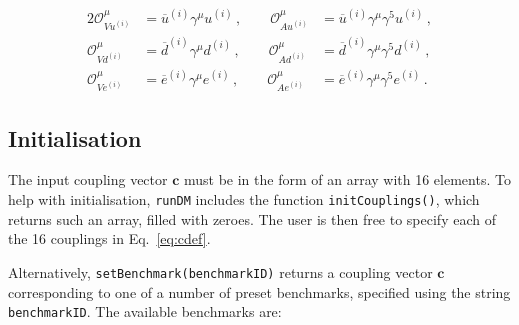\documentclass[notitlepage,12pt]{article}
\newcommand{\runDM}{\texttt{runDM}\xspace}
\begin{document}
\begin{alignat}{2}
\mathcal{O}_{Vu^{(i)}}^\mu &= \overline{u}^{(i)} \gamma^\mu u^{(i)}\,, \qquad \mathcal{O}_{Au^{(i)}}^\mu &= \overline{u}^{(i)} \gamma^\mu \gamma^5 u^{(i)}\,, \nonumber \\
\mathcal{O}_{Vd^{(i)}}^\mu &= \overline{d}^{(i)} \gamma^\mu d^{(i)}\,, \qquad \mathcal{O}_{Ad^{(i)}}^\mu &=  \overline{d}^{(i)} \gamma^\mu \gamma^5 d^{(i)}\,,\\
\mathcal{O}_{Ve^{(i)}}^\mu &= \overline{e}^{(i)} \gamma^\mu e^{(i)}\,, \qquad \mathcal{O}_{Ae^{(i)}}^\mu &=  \overline{e}^{(i)} \gamma^\mu \gamma^5 e^{(i)}\,. \nonumber
\end{alignat}

\subsection{Initialisation}

The input coupling vector $\mathbf{c}$ must be in the form of an array with 16 elements. To help with initialisation, \runDM includes the function \texttt{initCouplings()}, which returns such an array, filled with zeroes. The user is then free to specify each of the 16 couplings in Eq.~\ref{eq:cdef}.

Alternatively, \texttt{setBenchmark(benchmarkID)} returns a coupling vector $\mathbf{c}$ corresponding to one of a number of preset benchmarks, specified using the string \texttt{benchmarkID}. The available benchmarks are:
\end{document}
